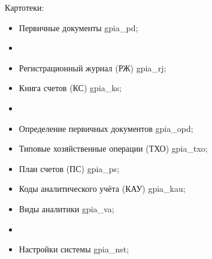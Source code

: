 Картотеки:

\begin{itemize}
    \item Первичные документы gpia\_pd;
    \item[]\hspace{0pt}
    \item Регистрационный журнал (РЖ) gpia\_rj;
    \item Книга счетов (КС) gpia\_ks;
    \item[]\hspace{0pt}
    \item Определение первичных документов gpia\_opd;
    \item Типовые хозяйственные операции (ТХО) gpia\_txo;
    \item План счетов (ПС) gpia\_ps;
    \item Коды аналитического учёта (КАУ) gpia\_kau;
    \item Виды аналитики gpia\_va;
    \item[]\hspace{0pt}
    \item Настройки системы gpia\_nst;
\end{itemize}

